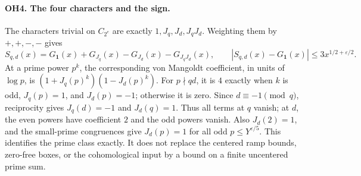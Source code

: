 \paragraph{OH4. The four characters and the sign.}
The characters trivial on $C_{2^e}$ are exactly
$1,J_q,J_d,J_qJ_d$.  Weighting them by $+,+,-,-$ gives
\[
 S_{q,d}(x)=G_{\mathbf1}(x)+G_{J_q}(x)-G_{J_d}(x)-G_{J_qJ_d}(x),
 \qquad |S_{q,d}(x)-G_{\mathbf1}(x)|\le3x^{1/2+\varepsilon/2}.
\]
At a prime power $p^k$, the corresponding von Mangoldt coefficient,
in units of $\log p$, is
$(1+J_q(p)^k)(1-J_d(p)^k)$.
For $p\nmid qd$, it is $4$ exactly when $k$ is odd,
$J_q(p)=1$, and $J_d(p)=-1$; otherwise it is zero.
Since $d\equiv-1\pmod q$, reciprocity gives $J_q(d)=-1$ and
$J_d(q)=1$.  Thus all terms at $q$ vanish; at $d$, the even powers have
coefficient $2$ and the odd powers vanish.  Also $J_d(2)=1$, and the
small-prime congruences give $J_d(p)=1$ for all odd
$p\le Y^{\varepsilon/5}$.  This identifies the prime class exactly.
It does not replace the centered ramp bounds, zero-free boxes, or the
cohomological input by a bound on a finite uncentered prime sum.
